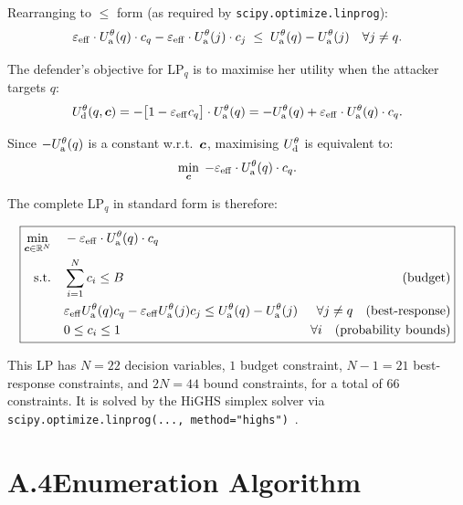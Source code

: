 Rearranging to $\leq$ form (as required by \texttt{scipy.optimize.linprog}):
\begin{equation}
  \varepsilon_\mathrm{eff} \cdot U_{\mathrm{a}}^\theta(q) \cdot c_q
  - \varepsilon_\mathrm{eff} \cdot U_{\mathrm{a}}^\theta(j) \cdot c_j
  \;\leq\;
  U_{\mathrm{a}}^\theta(q) - U_{\mathrm{a}}^\theta(j) \quad \forall j \neq q.
  \label{eq:br_leq}
\end{equation}

The defender's objective for LP$_q$ is to maximise her utility when the
attacker targets $q$:
\begin{equation}
  U_{\mathrm{d}}^\theta(q, \bm{c}) = -\bigl[1 - \varepsilon_\mathrm{eff} c_q \bigr]
    \cdot U_{\mathrm{a}}^\theta(q)
  = -U_{\mathrm{a}}^\theta(q) + \varepsilon_\mathrm{eff} \cdot U_{\mathrm{a}}^\theta(q) \cdot c_q.
\end{equation}

Since $-U_{\mathrm{a}}^\theta(q)$ is a constant w.r.t.\ $\bm{c}$, maximising
$U_{\mathrm{d}}^\theta$ is equivalent to:
\begin{equation}
  \min_{\bm{c}} \; -\varepsilon_\mathrm{eff} \cdot U_{\mathrm{a}}^\theta(q) \cdot c_q.
  \label{eq:lp_obj_app}
\end{equation}

The complete LP$_q$ in standard form is therefore:

\begin{equation}
  \boxed{
  \begin{aligned}
    \min_{\bm{c} \in \mathbb{R}^N} \quad
      & -\varepsilon_\mathrm{eff} \cdot U_{\mathrm{a}}^\theta(q) \cdot c_q \\
    \text{s.t.} \quad
      & \sum_{i=1}^N c_i \leq B & \text{(budget)} \\
      & \varepsilon_\mathrm{eff} U_{\mathrm{a}}^\theta(q) c_q
        - \varepsilon_\mathrm{eff} U_{\mathrm{a}}^\theta(j) c_j
        \leq U_{\mathrm{a}}^\theta(q) - U_{\mathrm{a}}^\theta(j)
        & \forall j \neq q \quad \text{(best-response)} \\
      & 0 \leq c_i \leq 1 & \forall i \quad \text{(probability bounds)}
  \end{aligned}
  }
  \label{eq:lp_full}
\end{equation}

This LP has $N = 22$ decision variables, $1$ budget constraint,
$N - 1 = 21$ best-response constraints, and $2N = 44$ bound constraints,
for a total of $66$ constraints.  It is solved by the HiGHS simplex
solver via \texttt{scipy.optimize.linprog(..., method="highs")}~\cite{Schrijver1986}.

\section*{A.4\quad Enumeration Algorithm}

